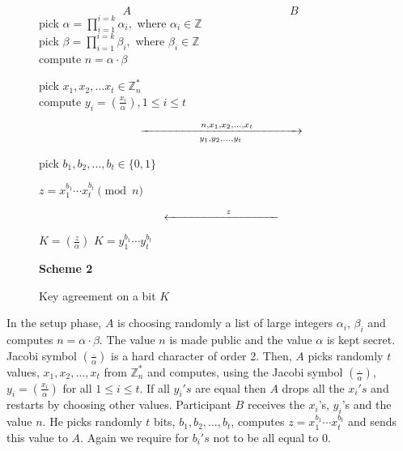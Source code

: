 \documentclass[11pt, a4paper, twoside, openright]{report}
\begin{document}
		
		\begin{figure}[h]
		
		\begin{equation*}
		A \qquad  \qquad \qquad \qquad \qquad \qquad \qquad B
		\end{equation*}
		pick $\alpha = \prod_{i=1}^{i=k} \alpha_i,$ where $\alpha_i \in \mathbb{Z}$ \\
		pick $\beta = \prod_{i=1}^{i=k} \beta_i,$ where $\beta_i \in \mathbb{Z}$ \\
		compute $n = \alpha \cdot \beta $
				
		\bigskip
				
		\noindent 
		pick $x_1, x_2, \ldots x_t \in \mathbb{Z}_n^*$ \\
		compute $y_i = (\frac{x_i}{\alpha}), 1 \leq i \leq t$
				 
		\begin{equation*}
		\qquad \xrightarrow[y_1,y_2, \ldots, y_t]{\hspace*{1.8cm} n,x_1,x_2,\ldots,x_t \qquad \qquad}  
		\end{equation*}
				
 
				
		\hspace{80mm} pick $b_1, b_2, \ldots, b_t \in \{ 0,1\}$ 
				
		\hspace{80mm} $z= x_1^{b_1} \cdots x_t^{b_t} \pmod{n}$
				
				
		\begin{equation*}
		\qquad \xleftarrow{\hspace*{1.8cm} z \qquad \qquad}  
		\end{equation*}   
				
		$K = (\frac{z}{\alpha})$ \hspace{80mm} $K = y_1^{b_1} \cdots y_t^{b_t}$
		
		\begin{center}
		\textbf{Scheme 2}
		\end{center}		
		\caption{Key agreement on a bit $K$}
		\label{agree}
		\end{figure}
		
	In the setup phase, $A$ is choosing randomly a list of large integers $\alpha_i$, $\beta_i$ and 
	computes $n= \alpha \cdot \beta$. The value $n$ is made public and the value $\alpha$ is kept secret.
	Jacobi symbol $(\frac{.}{\alpha})$ is a hard character of order 2.  
	Then, $A$ picks randomly $t$ values, $x_1,x_2, \ldots , x_t$ from $\mathbb{Z}_n^*$ and computes, 
	using the Jacobi symbol $(\frac{.}{\alpha})$, $y_i = (\frac{x_i}{\alpha})$ for all $1 \leq i \leq t$.
	If all $y_i's$ are equal then $A$ drops all the $x_i's$  and restarts by choosing other 
	values. Participant $B$ receives the $x_i$'s, $y_i$'s and the value $n$. He picks randomly $t$ bits, 
	$b_1, b_2, \ldots, b_t$, computes $z = x_1^{b_1} \cdots x_t^{b_t}$ and sends this value to $A$. 
	Again we require for $b_i's$ not to be all equal to 0. 
	
\end{document}
